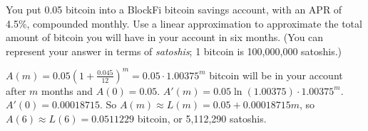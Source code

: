 \begin{example} You put 0.05 bitcoin into a BlockFi bitcoin savings account, with an APR of 4.5\%, compounded monthly. Use a linear approximation to approximate the total amount of bitcoin you will have in your account in six months. (You can represent your answer in terms of {\em satoshis}; 1 bitcoin is 100{,}000{,}000 satoshis.)
\begin{solution} $A(m) = 0.05\left(1+\frac{0.045}{12}\right)^m = 0.05\cdot 1.00375^m$ bitcoin will be in your account after $m$ months and $A(0) = 0.05$. $A'(m) = 0.05\ln(1.00375)\cdot 1.00375^m$. $A'(0) = 0.00018715$. So $A(m) \approx L(m) = 0.05 + 0.00018715m$, so $A(6) \approx L(6) = 0.0511229$ bitcoin, or 5{,}112{,}290 satoshis.
\end{solution}
\end{example}
